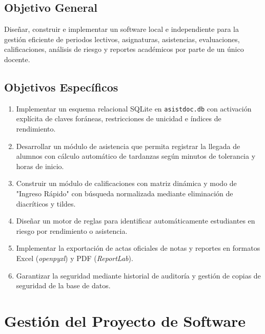 \documentclass[12pt,a4paper]{article}
\begin{document}
\subsection{Objetivo General}
Diseñar, construir e implementar un software local e independiente para la gestión eficiente de periodos lectivos, asignaturas, asistencias, evaluaciones, calificaciones, análisis de riesgo y reportes académicos por parte de un único docente.

\subsection{Objetivos Específicos}
\begin{enumerate}
    \item Implementar un esquema relacional SQLite en \texttt{asistdoc.db} con activación explícita de claves foráneas, restricciones de unicidad e índices de rendimiento.
    \item Desarrollar un módulo de asistencia que permita registrar la llegada de alumnos con cálculo automático de tardanzas según minutos de tolerancia y horas de inicio.
    \item Construir un módulo de calificaciones con matriz dinámica y modo de "Ingreso Rápido" con búsqueda normalizada mediante eliminación de diacríticos y tildes.
    \item Diseñar un motor de reglas para identificar automáticamente estudiantes en riesgo por rendimiento o asistencia.
    \item Implementar la exportación de actas oficiales de notas y reportes en formatos Excel (\textit{openpyxl}) y PDF (\textit{ReportLab}).
    \item Garantizar la seguridad mediante historial de auditoría y gestión de copias de seguridad de la base de datos.
\end{enumerate}

\section{Gestión del Proyecto de Software}
\end{document}
